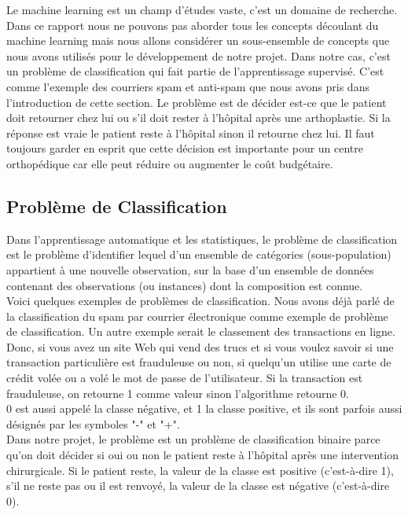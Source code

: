\documentclass[12pt, french]{article}
\begin{document}
Le machine learning est un champ d'études vaste, c'est un domaine de recherche. Dans ce rapport nous ne pouvons pas aborder tous les concepts découlant du machine learning mais nous allons considérer un sous-ensemble de concepts que nous avons utilisés pour le développement de notre projet. Dans notre cas, c'est un problème de classification qui fait partie de l'apprentissage supervisé. C'est comme l'exemple des courriers spam et anti-spam que nous avons pris dans l'introduction de cette section. Le problème est de décider est-ce que le patient doit retourner chez lui ou s'il doit rester à l'hôpital après une arthoplastie. Si la réponse est vraie le patient reste à l'hôpital sinon il retourne chez lui. Il faut toujours garder en esprit que cette décision est importante pour un centre orthopédique car elle peut réduire ou augmenter le coût budgétaire.   

\subsection{Problème de Classification}

Dans l'apprentissage automatique et les statistiques, le problème de classification est le problème d'identifier lequel d'un ensemble de catégories (sous-population) appartient à une nouvelle observation, sur la base d'un ensemble de données contenant des observations (ou instances) dont la composition est connue.\\

Voici quelques exemples de problèmes de classification. Nous avons déjà parlé de la classification du spam par courrier électronique comme exemple de problème de classification. Un autre exemple serait le classement des transactions en ligne. Donc, si vous avez un site Web qui vend des trucs et si vous voulez savoir si une transaction particulière est frauduleuse ou non, si quelqu'un utilise une carte de crédit volée ou a volé le mot de passe de l'utilisateur. Si la transaction est frauduleuse, on retourne 1 comme valeur sinon l'algorithme retourne 0.\\
0 est aussi appelé la classe négative, et 1 la classe positive, et ils sont parfois aussi désignés par les symboles "-" et "+".\\

Dans notre projet, le problème est un problème de classification binaire parce qu'on doit décider si oui ou non le patient reste à l'hôpital après une intervention chirurgicale. Si le patient reste, la valeur de la classe est positive (c'est-à-dire 1), s'il ne reste pas ou il est renvoyé, la valeur de la classe est négative (c'est-à-dire 0).
\end{document}
